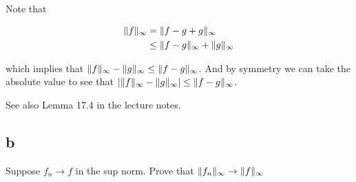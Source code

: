 \documentclass[]{article}
\DeclarePairedDelimiter\norm{\lVert}{\rVert}
\begin{document}








			Note that

			\begin{align*}
				\norm{f}_\infty &= \norm{f - g + g}_\infty \\
				&\leq \norm{f - g}_\infty + \norm{g}_\infty \\
			\end{align*}

			which implies that $\norm{f}_\infty - \norm{g}_\infty \leq \norm{f - g}_\infty$. And by symmetry we can take the absolute value to see that $| \norm{f}_\infty - \norm{g}_\infty | \leq \norm{f - g}_\infty$. 

			See also Lemma 17.4 in the lecture notes. 

		\subsection*{b}
		\begin{em}
			Suppose $f_n \to f$ in the sup norm. Prove that $\norm{f_n}_\infty \to \norm{f}_\infty$
		\end{em}
\end{document}
